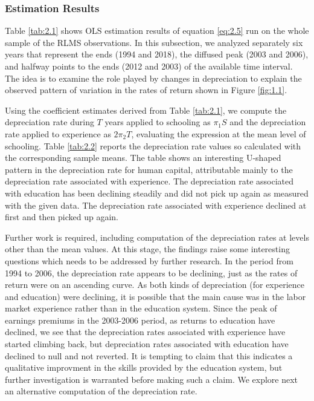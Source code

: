 \documentclass[alpha-refs]{wiley-article-02b}
\begin{document}
\subsubsection{Estimation Results}
Table \ref{tab:2.1} shows OLS estimation results of equation \ref{eq:2.5} run on the whole sample of the RLMS observations. In this subsection, we analyzed separately six years that represent the ends (1994 and 2018), the diffused peak (2003 and 2006), and halfway points to the ends (2012 and 2003) of the available time interval. The idea is to examine the role played by changes in depreciation to explain the observed pattern of variation in the rates of return shown in Figure \ref{fig:1.1}. 

Using the coefficient estimates derived from Table \ref{tab:2.1}, we compute the depreciation rate during $T$ years applied to schooling as $\pi_{1}S $ and the depreciation rate applied to experience as $ 2\pi_{2}T$, evaluating the expression at the mean level of schooling. Table \ref{tab:2.2} reports the depreciation rate values so calculated with the corresponding sample means. The table shows an interesting U-shaped pattern in the depreciation rate for human capital, attributable mainly to the depreciation rate associated with experience. The depreciation rate associated with education has been declining steadily and did not pick up again as measured with the given data. The depreciation rate associated with experience declined at first and then picked up again. 

Further work is required, including computation of the depreciation rates at levels other than the mean values. At this stage, the findings raise some interesting questions which needs to be addressed by further research. In the period from 1994 to 2006, the depreciation rate appears to be declining, just as the rates of return were on an ascending curve. As both kinds of depreciation (for experience and education) were declining, it is possible that the main cause was in the labor market experience rather than in the education system. Since the peak of earnings premiums in the 2003-2006 period, as returns to education have declined, we see that the depreciation rates associated with experience have started climbing back, but depreciation rates associated with education have declined to null and not reverted. It is tempting to claim that this indicates a qualitative improvment in the skills provided by the education system, but further investigation is warranted before making such a claim. We explore next an alternative computation of the depreciation rate. 
\end{document}
